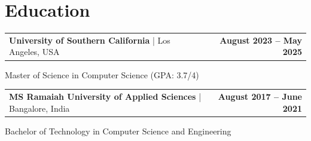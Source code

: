 \documentclass[10pt, letterpaper]{article}
\newenvironment{onecolentry}{
    \par\noindent
}{
    \par
}
\begin{document}


\vspace{-1 mm}
\section{Education}

\begin{tabularx}{\textwidth}{@{}Xr@{}}
    \textbf{University of Southern California} | Los Angeles, USA & \textbf{August 2023 – May 2025} \\
\end{tabularx}
\vspace{-4.5mm}
\begin{onecolentry}

    Master of Science in Computer Science (GPA: 3.7/4)\\
\end{onecolentry}

\vspace{0.1 cm}


\begin{tabularx}{\textwidth}{@{}Xr@{}}
    \textbf{MS Ramaiah University of Applied Sciences} | Bangalore, India & \textbf{August 2017 – June 2021} \\
\end{tabularx}
\vspace{-4.5mm}
\begin{onecolentry}

Bachelor of Technology in Computer Science and Engineering\\
\end{onecolentry}
\end{document}
